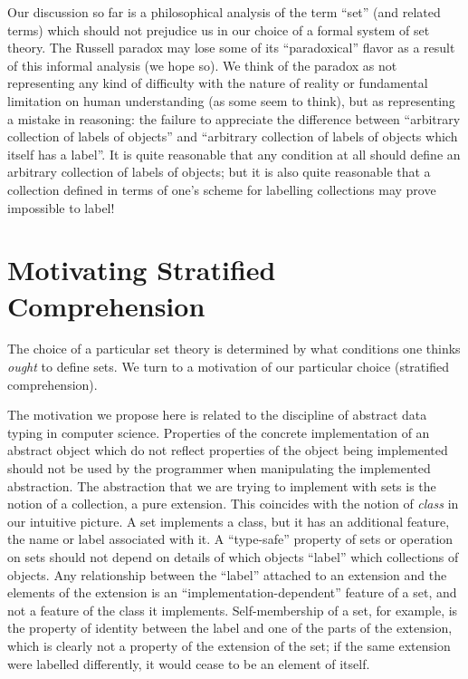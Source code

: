 Our discussion so far is a philosophical analysis of the term ``set''
(and related terms) which should not prejudice us in our choice of a
formal system of set theory.  The Russell paradox may
lose some of its ``paradoxical'' flavor as a result of this informal analysis
(we hope so).  We think of the paradox as not representing any kind of
difficulty with the nature of reality or fundamental limitation on
human understanding (as some seem to think), but as representing a
mistake in reasoning: the failure to appreciate the difference between
``arbitrary collection of labels of objects'' and ``arbitrary
collection of labels of objects which itself has a label''.  It is
quite reasonable that any condition at all should define an arbitrary
collection of labels of objects; but it is also quite reasonable that
a collection defined in terms of one's scheme for labelling
collections may prove impossible to label!



\section[Motivating Stratified Comprehension]{Motivating
Stratified Comprehension}

The choice of a particular set theory is determined by what conditions
one thinks {\itshape ought\/} to define sets.  We turn to a motivation of
our particular choice (stratified comprehension).

The motivation we propose here is related to the discipline of
abstract data typing in computer science.
Properties of the concrete implementation of an abstract
object which do not reflect properties of the object being implemented should
not be used by the programmer when manipulating the implemented abstraction.
The abstraction that we are trying to implement with sets is the notion of a
collection, a pure extension.  This coincides with the notion of {\itshape
class\/} in our intuitive picture.  A set implements a class, but it has an
additional feature, the name or label associated with it.  A
``type-safe'' property of sets or operation on sets should
not depend on details of which objects ``label'' which collections of objects.
Any relationship between the ``label'' attached to an extension and
the elements of the extension is an ``implementation-dependent''
feature of a set, and not a feature of the class it implements.
Self-membership of a set, for example, is the
property of identity 
between the label and one of the parts of the extension, which is
clearly not a property of the extension of the set; if the same
extension were labelled differently, it would cease to be an element
of itself.

